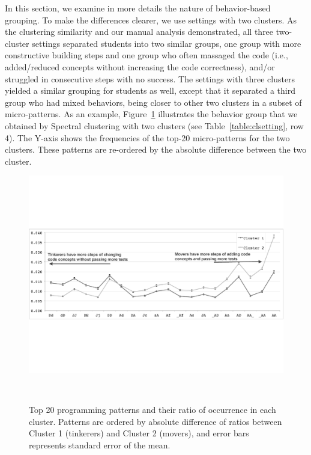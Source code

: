 \documentclass{sigchi}
\begin{document}
In this section, we examine in more details the nature of behavior-based grouping. To make the differences clearer, we use settings with two clusters. As the clustering similarity and our manual analysis demonstrated, all three two-cluster settings separated students into two similar groups, one group with more constructive building steps and one group who often massaged the code (i.e., added/reduced concepts without increasing the code correctness), and/or struggled in consecutive steps with no success. The settings with three clusters yielded a similar grouping for students as well, except that it separated a third group who had mixed behaviors, being closer to other two clusters in a subset of micro-patterns. As an example, Figure~\ref{fig:clusters} illustrates the behavior group that we obtained by Spectral clustering with two clusters (see Table~\ref{table:clsetting}, row 4). The Y-axis shows the frequencies of the top-20 micro-patterns for the two clusters. These patterns are re-ordered by the absolute difference between the two cluster.

\begin{figure}[thb]
  \centering
  \includegraphics[width=15cm]{figures/Cluster_SpecPrevSnapAdaptTime2Sup1.pdf} %
  \caption{Top 20 programming patterns and their ratio of occurrence in each cluster. Patterns are ordered by absolute difference of ratios between Cluster 1 (tinkerers) and Cluster 2 (movers), and error bars represents standard error of the mean.}~\label{fig:clusters} \vspace{-10pt}
\end{figure}
\end{document}
